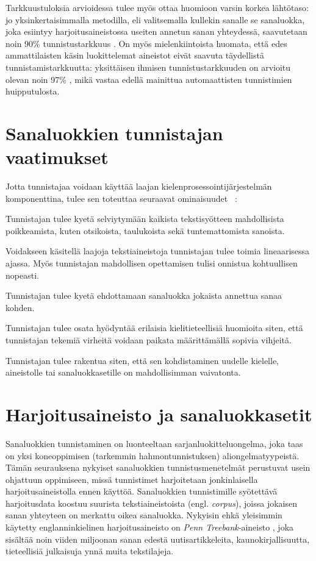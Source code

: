 \documentclass[utf8,bachelor,manualbib]{gradu3}
\begin{document}
Tarkkuustuloksia arvioidessa tulee myös ottaa huomioon varsin korkea lähtötaso: jo yksinkertaisimmalla metodilla, eli valitsemalla kullekin sanalle se sanaluokka, joka esiintyy harjoitusaineistossa useiten annetun sanan yhteydessä, saavutetaan noin 90\% tunnistustarkkuus \citep{charniak1993}. On myös mielenkiintoista huomata, että edes ammattilaisten käsin luokittelemat aineistot eivät saavuta täydellistä tunnistamistarkkuutta: yksittäisen ihmisen tunnistustarkkuuden on arvioitu olevan noin 97\% \citep{manning2011}, mikä vastaa edellä mainittua automaattisten tunnistimien huipputulosta.
 
\section{Sanaluokkien tunnistajan vaatimukset}

Jotta tunnistajaa voidaan käyttää laajan kielenprosessointijärjestelmän komponenttina, tulee sen toteuttaa seuraavat ominaisuudet ~\citep{cutting1992}: 

\begin{description}[labelindent=1cm]
 \item[Kestävyys] Tunnistajan tulee kyetä selviytymään kaikista tekstisyötteen mahdollisista poikkeamista, kuten otsikoista, taulukoista sekä tuntemattomista sanoista.
 \item[Tehokkuus] Voidakseen käsitellä laajoja tekstiaineistoja tunnistajan tulee toimia lineaarisessa ajassa. Myös tunnistajan mahdollisen opettamisen tulisi onnistua kohtuullisen nopeasti.
 \item[Tarkkuus] Tunnistajan tulee kyetä ehdottamaan sanaluokka jokaista annettua sanaa kohden.
 \item[Viritettävyys] Tunnistajan tulee osata hyödyntää erilaisia kielitieteellisiä huomioita siten, että tunnistajan tekemiä virheitä voidaan paikata määrittämällä sopivia vihjeitä.
 \item[Uudelleenkäytettävyys] Tunnistajan tulee rakentua siten, että sen kohdistaminen uudelle kielelle, aineistolle tai sanaluokkasetille on mahdollisimman vaivatonta.
\end{description}

\section{Harjoitusaineisto ja sanaluokkasetit}

Sanaluokkien tunnistaminen on luonteeltaan sarjanluokitteluongelma, joka taas on yksi koneoppimisen (tarkemmin hahmontunnistuksen) aliongelmatyypeistä. Tämän seurauksena nykyiset sanaluokkien tunnistusmenetelmät perustuvat usein ohjattuun oppimiseen, missä tunnistimet harjoitetaan jonkinlaisella harjoitusaineistolla ennen käyttöä. Sanaluokkien tunnistimille syötettävä harjoitusdata koostuu suurista tekstiaineistoista (engl. \textit{corpus}), joissa jokaisen sanan yhteyteen on merkattu oikea sanaluokka. Nykyisin ehkä yleisimmin käytetty englanninkielinen harjoitusaineisto on \textit{Penn Treebank}-aineisto \citep{marcus1993}, joka sisältää noin viiden miljoonan sanan edestä uutisartikkeleita, kaunokirjallisuutta, tieteellisiä julkaisuja ynnä muita tekstilajeja.
\end{document}

